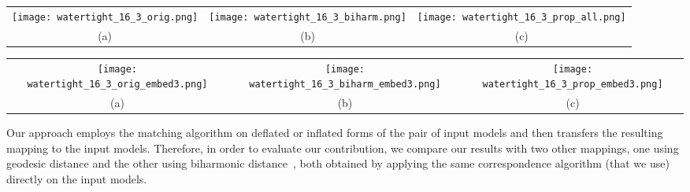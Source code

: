 \begin{figure*}[htb]
  \centering
  \begin{tabular}{ccc}
  \texttt{[image: watertight\_16\_3\_orig.png]} &
  \texttt{[image: watertight\_16\_3\_biharm.png]} &
  \texttt{[image: watertight\_16\_3\_prop\_all.png]}\\
  (a) & (b) & (c)
  \end{tabular}
  \caption{\label{fig:watertight_16_3}
  One-to-one mappings for a pair of human shapes from Watertight with different topology where both hands of the sitting woman are attached to the legs. (a) Correspondence between topologically different shapes using geodesic distance leads to errors where the right arm of the first shape is unmatched and the left arm is matched to the head of the sitting woman (mappings in red color). (b) Correspondence using biharmonic distance results in mapping the head of each shape to the arms of the other shape (mappings in red color). (c) Correspondence between inner iso-surfaces at level $0.4$ leads to a better result (left). Note that deflated forms of the shapes have the same topology as the arms of the sitting woman are separated from the legs. The mapping between the iso-surfaces is transferred to the input shapes (right).}
\end{figure*}
\begin{figure*}[htb]
  \centering
  \begin{tabular}{ccc}
  \texttt{[image: watertight\_16\_3\_orig\_embed3.png]} &
  \texttt{[image: watertight\_16\_3\_biharm\_embed3.png]} &
  \texttt{[image: watertight\_16\_3\_prop\_embed3.png]} \\
  (a) & (b) & (c)
  \end{tabular}
  \caption{\label{fig:watertight_16_3_embed}
  Spectral embeddings and alignments that lead to the one-to-one mappings shown in Figure~\ref{fig:watertight_16_3}. Only the first $3$ dimensions are plotted. Red and blue points correspond to the standing and sitting woman, respectively. Sample vertices on the input shapes are embedded (a) using their pairwise geodesic distance (b) using their pairwise biharmonic distance. (c) Sample vertices on the inner iso-surfaces are embedded using their pairwise geodesic distance.}
\end{figure*}

Our approach employs the matching algorithm \cite{ys2012EM} on deflated or inflated forms of the pair of input models and then transfers the resulting mapping to the input models. Therefore, in order to evaluate  our contribution, we compare our results with two other mappings, one using geodesic distance and the other using  biharmonic distance~\cite{Lipman10}, both  obtained by applying the same correspondence algorithm (that we use) directly on the input models.

